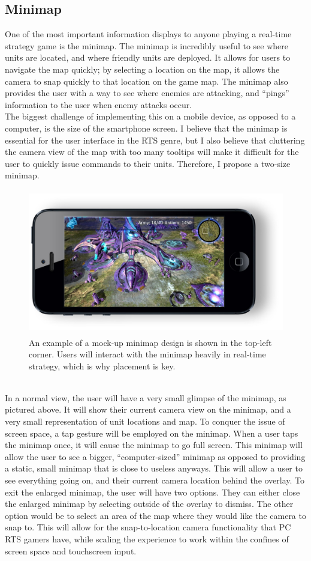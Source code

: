 \documentclass[11pt]{article}
\begin{document}
	\subsection{Minimap}
	One of the most important information displays to anyone playing a real-time strategy game is the minimap. The minimap is incredibly useful to see where units are located, and where friendly units are deployed. It allows for users to navigate the map quickly; by selecting a location on the map, it allows the camera to snap quickly to that location on the game map. The minimap also provides the user with a way to see where enemies are attacking, and ``pings'' information to the user when enemy attacks occur.\\
	\indent The biggest challenge of implementing this on a mobile device, as opposed to a computer, is the size of the smartphone screen. I believe that the minimap is essential for the user interface in the RTS genre, but I also believe that cluttering the camera view of the map with too many tooltips will make it difficult for the user to quickly issue commands to their units. Therefore, I propose a two-size minimap.
	\begin{figure}[h]
	\begin{center}
	\includegraphics[height = 2.5in]{minimap}
	\caption{An example of a mock-up minimap design is shown in the top-left corner. Users will interact with the minimap heavily in real-time strategy, which is why placement is key.}
	\end{center}
	\end{figure} \\
	\indent In a normal view, the user will have a very small glimpse of the minimap, as pictured above. It will show their current camera view on the minimap, and a very small representation of unit locations and map. To conquer the issue of screen space, a tap gesture will be employed on the minimap. When a user taps the minimap once, it will cause the minimap to go full screen. This minimap will allow the user to see a bigger, ``computer-sized'' minimap as opposed to providing a static, small minimap that is close to useless anyways. This will allow a user to see everything going on, and their current camera location behind the overlay. To exit the enlarged minimap, the user will have two options. They can either close the enlarged minimap by selecting outside of the overlay to dismiss. The other option would be to select an area of the map where they would like the camera to snap to. This will allow for the snap-to-location camera functionality that PC RTS gamers have, while scaling the experience to work within the confines of screen space and touchscreen input.
\end{document}
